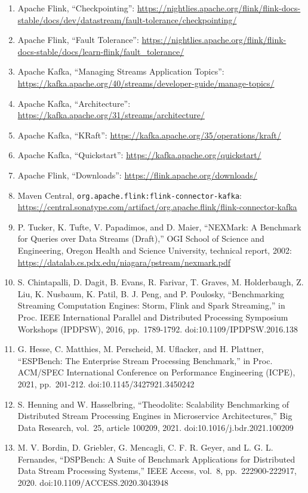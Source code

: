 \documentclass[
]{article}
\providecommand{\tightlist}{%
  \setlength{\itemsep}{0pt}\setlength{\parskip}{0pt}}
\begin{document}
\begin{enumerate}
\def\labelenumi{\arabic{enumi}.}
\tightlist
\item
  Apache Flink, ``Checkpointing'':
  \url{https://nightlies.apache.org/flink/flink-docs-stable/docs/dev/datastream/fault-tolerance/checkpointing/}
\item
  Apache Flink, ``Fault Tolerance'':
  \url{https://nightlies.apache.org/flink/flink-docs-stable/docs/learn-flink/fault_tolerance/}
\item
  Apache Kafka, ``Managing Streams Application Topics'':
  \url{https://kafka.apache.org/40/streams/developer-guide/manage-topics/}
\item
  Apache Kafka, ``Architecture'':
  \url{https://kafka.apache.org/31/streams/architecture/}
\item
  Apache Kafka, ``KRaft'':
  \url{https://kafka.apache.org/35/operations/kraft/}
\item
  Apache Kafka, ``Quickstart'':
  \url{https://kafka.apache.org/quickstart/}
\item
  Apache Flink, ``Downloads'': \url{https://flink.apache.org/downloads/}
\item
  Maven Central, \texttt{org.apache.flink:flink-connector-kafka}:
  \url{https://central.sonatype.com/artifact/org.apache.flink/flink-connector-kafka}
\item
  P. Tucker, K. Tufte, V. Papadimos, and D. Maier, ``NEXMark: A
  Benchmark for Queries over Data Streams (Draft),'' OGI School of
  Science and Engineering, Oregon Health and Science University,
  technical report, 2002:
  \url{https://datalab.cs.pdx.edu/niagara/pstream/nexmark.pdf}
\item
  S. Chintapalli, D. Dagit, B. Evans, R. Farivar, T. Graves, M.
  Holderbaugh, Z. Liu, K. Nusbaum, K. Patil, B. J. Peng, and P.
  Poulosky, ``Benchmarking Streaming Computation Engines: Storm, Flink
  and Spark Streaming,'' in Proc. IEEE International Parallel and
  Distributed Processing Symposium Workshops (IPDPSW), 2016,
  pp.~1789-1792. doi:10.1109/IPDPSW.2016.138
\item
  G. Hesse, C. Matthies, M. Perscheid, M. Uflacker, and H. Plattner,
  ``ESPBench: The Enterprise Stream Processing Benchmark,'' in Proc.
  ACM/SPEC International Conference on Performance Engineering (ICPE),
  2021, pp.~201-212. doi:10.1145/3427921.3450242
\item
  S. Henning and W. Hasselbring, ``Theodolite: Scalability Benchmarking
  of Distributed Stream Processing Engines in Microservice
  Architectures,'' Big Data Research, vol.~25, article 100209, 2021.
  doi:10.1016/j.bdr.2021.100209
\item
  M. V. Bordin, D. Griebler, G. Mencagli, C. F. R. Geyer, and L. G. L.
  Fernandes, ``DSPBench: A Suite of Benchmark Applications for
  Distributed Data Stream Processing Systems,'' IEEE Access, vol.~8,
  pp.~222900-222917, 2020. doi:10.1109/ACCESS.2020.3043948
\end{enumerate}
\end{document}
